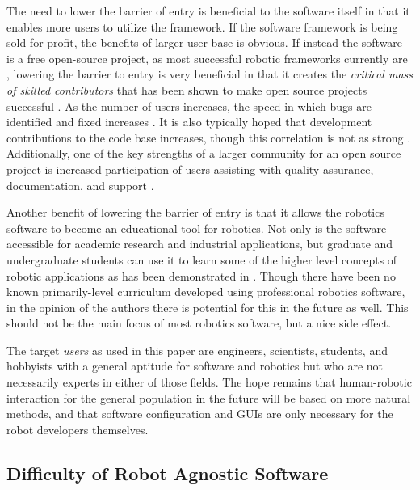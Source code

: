 \documentclass[10pt,journal,compsoc]{joser1}
\begin{document}
{The need to lower the barrier of entry is beneficial to the software itself in that it enables more users to utilize the framework. If the software framework is being sold for profit, the benefits of larger user base is obvious. If instead the software is a free open-source project, as most successful robotic frameworks currently are \cite{makarenko2007benefits}, lowering the barrier to entry is very beneficial in that it creates the \textit{critical mass of skilled contributors} that has been shown to make open source projects successful \cite{bruyninckx2001open}. As the number of users increases, the speed in which bugs are identified and fixed increases \cite{schmidt1999software}. It is also typically hoped that development contributions to the code base increases, though this correlation is not as strong \cite{schmidt1999software}. Additionally, one of the key strengths of a larger community for an open source project is increased participation of users assisting with quality assurance, documentation, 
and support \cite{schmidt2001leveraging}.

Another benefit of lowering the barrier of entry is that it allows the robotics software to become an educational tool for robotics. Not only is the software accessible for academic research and industrial applications, but graduate and undergraduate students can use it to learn some of the higher level concepts of robotic applications as has been demonstrated in \cite{correll2013one, moll2011teaching}. Though there have been no known primarily-level curriculum developed using professional robotics software, in the opinion of the authors there is potential for this in the future as well. This should not be the main focus of most robotics software, but a nice side effect.

The target \textit{users} as used in this paper are engineers, scientists, students, and hobbyists with a general aptitude for software and robotics but who are not necessarily experts in either of those fields. The hope remains that human-robotic interaction for the general population in the future will be based on more natural methods, and that software configuration and GUIs are only necessary for the robot developers themselves.

\subsection{Difficulty of Robot Agnostic Software}

}
\end{document}
